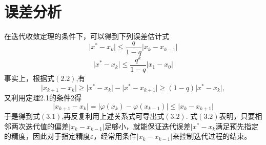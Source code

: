 \section{误差分析}
在迭代收敛定理的条件下，可以得到下列误差估计式
\begin{equation}
\lvert x^*-x_k\rvert\leq \frac q {1-q} \lvert x_k-x_{k-1}\rvert
\end{equation}
\begin{equation}
\lvert x^*-x_k\rvert\leq \frac {q^k} {1-q} \lvert x_1-x_0\rvert
\end{equation}
事实上，根据式$(2.2)$,有
\begin{equation}
\lvert x_{k+1}-x_k\rvert\geq\lvert x^*-x_k \rvert-\lvert x^*-x_{k+1}\rvert\geq(1-q)\lvert x^*-x_k\rvert,
\end{equation}
又利用定理2.1的条件$2$得
\begin{equation}
\lvert x_{k+1}-x_k\rvert=\lvert \varphi(x_k)-\varphi (x_{k-1})\rvert\leq\lvert x_k-x_{k+1} \rvert
\end{equation}
于是得到式$(3.1)$,再反复利用上述关系式可导出式$(3.2)$.
式$(3.2)$表明，只要相邻两次迭代值的偏差$\lvert x_k - x_{k-1} \rvert$足够小，就能保证迭代误差$\vert x^*-x_k$满足预先指定的精度，因此对于指定精度$\varepsilon$，经常用条件$\lvert x_k -x_{k-1}\rvert$来控制迭代过程的结束。

